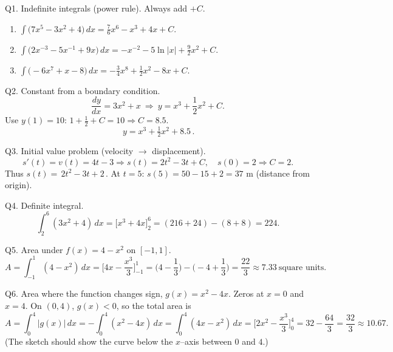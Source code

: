 \documentclass[11pt]{article}
\def\textbf#1{#1}%
\begin{document}
\begin{solution}
\textbf{Q1. Indefinite integrals (power rule).} Always add $+C$.
\begin{enumerate}
  \item $\displaystyle \int \big(7x^{5}-3x^{2}+4\big)\,dx
  = \frac{7}{6}x^{6}-x^{3}+4x + C.$
  \item $\displaystyle \int \big(2x^{-3}-5x^{-1}+9x\big)\,dx
  = -x^{-2}-5\ln|x|+\frac{9}{2}x^{2}+C.$
  \item $\displaystyle \int \big(-6x^{7}+x-8\big)\,dx
  = -\frac{3}{4}x^{8}+\frac{1}{2}x^{2}-8x + C.$
\end{enumerate}
\end{solution}

\begin{solution}
\textbf{Q2. Constant from a boundary condition.}
\[
\frac{dy}{dx}=3x^{2}+x \ \Rightarrow\ y=x^{3}+\frac{1}{2}x^{2}+C.
\]
Use $y(1)=10$: $1+\frac12+C=10 \Rightarrow C=8.5$.  
\[
\boxed{\,y=x^{3}+\tfrac12 x^{2}+8.5\, }.
\]
\end{solution}

\begin{solution}
\textbf{Q3. Initial value problem (velocity $\to$ displacement).}
\[
s'(t)=v(t)=4t-3 \Rightarrow s(t)=2t^{2}-3t+C,\quad s(0)=2\Rightarrow C=2.
\]
Thus $s(t)=\boxed{\,2t^{2}-3t+2\,}$.  
At $t=5$: $s(5)=50-15+2=\boxed{37\text{ m}}$ (distance from origin).
\end{solution}

\begin{solution}
\textbf{Q4. Definite integral.}
\[
\int_{2}^{6}(3x^{2}+4)\,dx=\big[x^{3}+4x\big]_{2}^{6}
=(216+24)-(8+8)=\boxed{224}.
\]
\end{solution}

\begin{solution}
\textbf{Q5. Area under $f(x)=4-x^{2}$ on $[-1,1]$.}
\[
A=\int_{-1}^{1}(4-x^{2})\,dx=\Big[4x-\frac{x^{3}}{3}\Big]_{-1}^{1}
=\Big(4-\frac13\Big)-\Big(-4+\frac13\Big)=\boxed{\frac{22}{3}}
\approx \boxed{7.33}\ \text{square units}.
\]
\end{solution}

\begin{solution}
\textbf{Q6. Area where the function changes sign, $g(x)=x^{2}-4x$.}
Zeros at $x=0$ and $x=4$. On $(0,4)$, $g(x)<0$, so the total area is
\[
A=\int_{0}^{4}|g(x)|\,dx=-\int_{0}^{4}(x^{2}-4x)\,dx
=\int_{0}^{4}(4x-x^{2})\,dx=\Big[2x^{2}-\frac{x^{3}}{3}\Big]_{0}^{4}
=32-\frac{64}{3}=\boxed{\frac{32}{3}} \approx 10.67.
\]
(The sketch should show the curve below the $x$–axis between $0$ and $4$.)
\end{solution}
\end{document}
